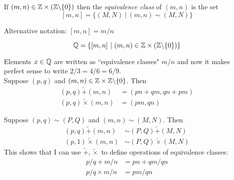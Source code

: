 \documentclass[twoside]{scrartcl}
\begin{document}
\begin{definition}
If $(m,n) \in \mathbb{Z} \times (\mathbb{Z} \backslash\{0\})$ then the \emph{equivalence class} of $(m,n)$ is the set 
\[[m,n] = \{(M,N) ~|~ (m,n) \sim (M,N)\}\]
\end{definition}

Alternative notation: $[m,n] = m/n$\\

\begin{definition}
\[\mathbb{Q} = \{[m,n] ~|~ (m,n) \in \mathbb{Z} \times (\mathbb{Z} \backslash\{0\})\}\]	
\end{definition}
Elements $x \in\mathbb{Q}$ are written as ``equivalence classes" $m/n$ and now it makes perfect sense to write $2/3 = 4/6 = 6/9$.\\

Suppose $(p,q)$ and $(m,n) \in \mathbb{Z} \times \mathbb{Z}\backslash\{0\}$. Then 
\[
\begin{aligned}
  (p,q) \widetilde{+} (m,n) &= (pn + qm, qn + pm)\\
  (p,q) \widetilde{\times} (m,n) &= (pm, qn)
\end{aligned}
\]


Suppose $(p,q) \sim (P,Q)$ and $(m,n) \sim (M,N)$. Then
\[
\begin{aligned}
  (p,q) \widetilde{+} (m,n) &\sim (P,Q) \widetilde{+} (M,N)\\
  (p,1) \widetilde{\times} (m,n) &\sim (P,Q) \widetilde{\times} (M,N)
\end{aligned}
\]
This shows that I can use $\widetilde{+}, \widetilde{\times}$ to define operations of equivalence classes: 
\[
\begin{aligned}
  p/q + m/n &= pn + qm/qn\\
  p/q \times m/n &= pm / qn
\end{aligned}
\]
\end{document}
